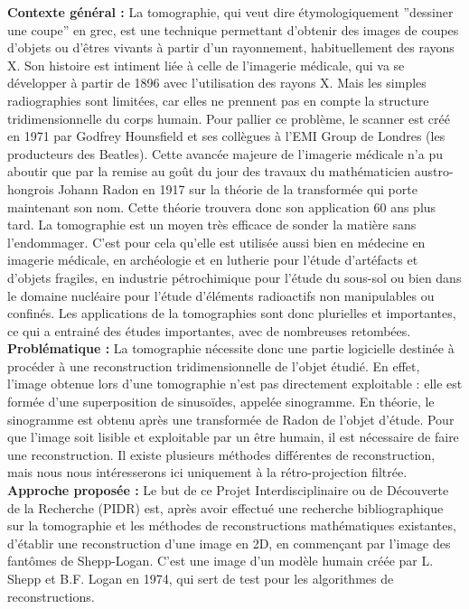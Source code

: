 \documentclass[conference]{IEEEtran}
\begin{document}
\textbf{Contexte général :}
La tomographie, qui veut dire étymologiquement ”dessiner une coupe” en grec, est une technique permettant d’obtenir des images de coupes d’objets ou d’êtres vivants à partir d'un rayonnement, habituellement des rayons X. Son histoire est intiment liée à celle de l’imagerie médicale, qui va se développer à partir de 1896 avec l’utilisation des rayons X. Mais les simples radiographies sont limitées, car elles ne prennent pas en compte la structure tridimensionnelle du corps humain. Pour pallier ce problème, le scanner est créé en 1971 par Godfrey Hounsfield et ses collègues à l’EMI Group de Londres (les producteurs des Beatles). Cette avancée majeure de l’imagerie médicale n’a pu aboutir que par la remise au goût du jour des travaux du mathématicien austro-hongrois Johann Radon en 1917 sur la théorie de la transformée qui porte maintenant son nom. Cette théorie trouvera donc son application 60 ans plus tard.
La tomographie est un moyen très efficace de sonder la matière sans l’endommager. C’est pour cela qu’elle est utilisée aussi bien en médecine en imagerie médicale, en archéologie et en lutherie pour l’étude d’artéfacts et d’objets fragiles, en industrie pétrochimique pour l’étude du sous-sol ou bien dans le domaine nucléaire pour l’étude d’éléments radioactifs non manipulables ou confinés. Les applications de la tomographies sont donc plurielles et importantes, ce qui a entrainé des études importantes, avec de nombreuses retombées.
\\
\textbf{Problématique :}
La tomographie nécessite donc une partie logicielle destinée à procéder à une reconstruction tridimensionnelle de l’objet étudié. En effet, l’image obtenue lors d’une tomographie n’est pas directement exploitable : elle est formée d’une superposition de sinusoïdes, appelée sinogramme. En théorie, le sinogramme est obtenu après une transformée de Radon de l’objet d’étude. Pour que l’image soit lisible et exploitable par un être humain, il est nécessaire de faire une reconstruction. Il existe plusieurs méthodes différentes de reconstruction, mais nous nous intéresserons ici uniquement à la rétro-projection filtrée.
\\
\textbf{Approche proposée :}
Le but de ce Projet Interdisciplinaire ou de Découverte de la Recherche (PIDR) est, après avoir effectué une recherche bibliographique sur la tomographie et les méthodes de reconstructions mathématiques existantes,  d’établir une reconstruction d’une image en 2D, en commençant par l’image des fantômes de Shepp-Logan. C’est une image d’un modèle humain créée par L. Shepp et B.F. Logan en 1974, qui sert de test pour les algorithmes de reconstructions.
\end{document}
